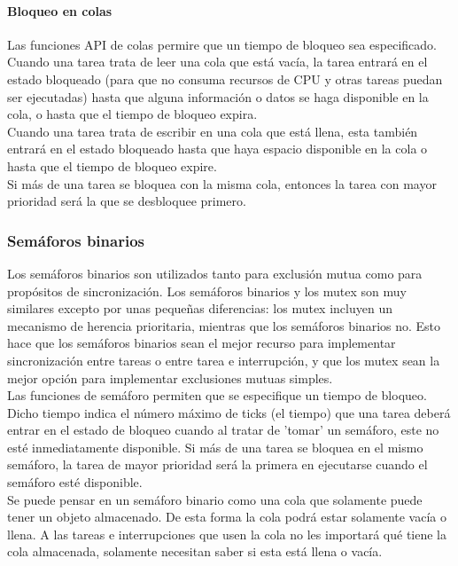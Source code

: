 \paragraph{Bloqueo en colas}

Las funciones API de colas permire que un tiempo de bloqueo sea especificado. Cuando una tarea trata de leer una cola que está vacía, la tarea entrará en el estado bloqueado (para que no consuma recursos de CPU y otras tareas puedan ser ejecutadas) hasta que alguna información o datos se haga disponible en la cola, o hasta que el tiempo de bloqueo expira.\\
Cuando una tarea trata de escribir en una cola que está llena, esta también entrará en el estado bloqueado hasta que haya espacio disponible en la cola o hasta que el tiempo de bloqueo expire.\\
Si más de una tarea se bloquea con la misma cola, entonces la tarea con mayor prioridad será la que se desbloquee primero. 

\subsubsection{Semáforos binarios}

Los semáforos binarios son utilizados tanto para exclusión mutua como para propósitos de sincronización. Los semáforos binarios y los mutex son muy similares excepto por unas pequeñas diferencias: los mutex incluyen un mecanismo de herencia prioritaria, mientras que los semáforos binarios no. Esto hace que los semáforos binarios sean el mejor recurso para implementar sincronización entre tareas o entre tarea e interrupción, y que los mutex sean la mejor opción para implementar exclusiones mutuas simples. \\

Las funciones de semáforo permiten que se especifique un tiempo de bloqueo. Dicho tiempo indica el número máximo de ticks (el tiempo) que una tarea deberá entrar en el estado de bloqueo cuando al tratar de 'tomar' un semáforo, este no esté inmediatamente disponible. Si más de una tarea se bloquea en el mismo semáforo, la tarea de mayor prioridad será la primera en ejecutarse cuando el semáforo esté disponible. \\

Se puede pensar en un semáforo binario como una cola que solamente puede tener un objeto almacenado. De esta forma la cola podrá estar solamente vacía o llena. A las tareas e interrupciones que usen la cola no les importará qué tiene la cola almacenada, solamente necesitan saber si esta está llena o vacía. \\

